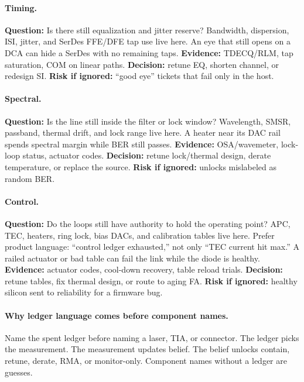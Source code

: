 \paragraph{Timing.}
\textbf{Question:} Is there still equalization and jitter reserve?
Bandwidth, dispersion, ISI, jitter, and SerDes FFE/DFE tap
use live here. An eye that still opens on a DCA can hide a SerDes with no
remaining taps. \textbf{Evidence:} TDECQ/RLM, tap saturation, COM on linear
paths. \textbf{Decision:} retune EQ, shorten channel, or redesign SI.
\textbf{Risk if ignored:} ``good eye'' tickets that fail only in the host.

\paragraph{Spectral.}
\textbf{Question:} Is the line still inside the filter or lock window?
Wavelength, SMSR, passband, thermal drift, and lock range live
here. A heater near its DAC rail spends spectral margin while BER still
passes. \textbf{Evidence:} OSA/wavemeter, lock-loop status, actuator codes.
\textbf{Decision:} retune lock/thermal design, derate temperature, or replace
the source. \textbf{Risk if ignored:} unlocks mislabeled as random BER.

\paragraph{Control.}
\textbf{Question:} Do the loops still have authority to hold the operating
point?
APC, TEC, heaters, ring lock, bias DACs, and
calibration tables live here. Prefer product language: ``control ledger
exhausted,'' not only ``TEC current hit max.'' A railed actuator or bad table
can fail the link while the diode is healthy. \textbf{Evidence:} actuator
codes, cool-down recovery, table reload trials.
\textbf{Decision:} retune tables, fix thermal design, or route to aging FA.
\textbf{Risk if ignored:} healthy silicon sent to reliability for a firmware
bug.

\paragraph{Why ledger language comes before component names.}
Name the spent ledger before naming a laser, TIA, or connector. The ledger
picks the measurement. The measurement updates belief. The belief unlocks
contain, retune, derate, RMA, or monitor-only. Component names without a
ledger are guesses.

